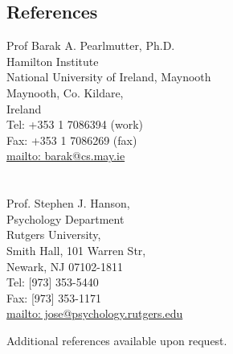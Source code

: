 \documentclass[10pt,overlapped,line]{res}
\begin{document}
\begin{resume}
 \section{References}
  \begin{multicols}{2}
 {\small
    Prof Barak A. Pearlmutter, Ph.D. \\
    Hamilton Institute \\
    National University of Ireland, Maynooth \\
    Maynooth, Co. Kildare, \\
    Ireland \\
    Tel: +353 1 7086394 (work) \\
    Fax: +353 1 7086269 (fax) \\
    \href{URL}{mailto: barak@cs.may.ie} \\
\\
\\
    Prof. Stephen J. Hanson, \\
    Psychology Department \\
    Rutgers University, \\
    Smith Hall, 101 Warren Str, \\
    Newark, NJ 07102-1811 \\
    Tel: [973] 353-5440 \\
    Fax: [973] 353-1171 \\
    \href{URL}{mailto: jose@psychology.rutgers.edu} \\
 }
 \end{multicols}

Additional references available upon request.



\end{resume}
\end{document}
